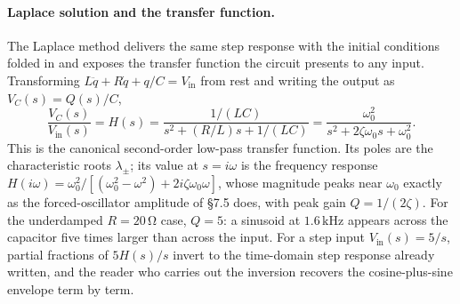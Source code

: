 \paragraph{Laplace solution and the transfer function.} The Laplace
method delivers the same step response with the initial conditions
folded in and exposes the transfer function the circuit presents to
any input. Transforming $L\ddot{q} + R\dot{q} + q/C = V_{\text{in}}$
from rest and writing the output as $V_{C}(s) = Q(s)/C$,
\[
\frac{V_{C}(s)}{V_{\text{in}}(s)} = H(s) = \frac{1/(LC)}{s^{2} +
(R/L)s + 1/(LC)} = \frac{\omega_{0}^{2}}{s^{2} + 2\zeta\omega_{0} s
+ \omega_{0}^{2}}.
\]
This is the canonical second-order low-pass transfer function. Its
poles are the characteristic roots $\lambda_{\pm}$; its value at
$s = i\omega$ is the frequency response $H(i\omega) =
\omega_{0}^{2}/[(\omega_{0}^{2} - \omega^{2}) + 2i\zeta\omega_{0}
\omega]$, whose magnitude peaks near $\omega_{0}$ exactly as the
forced-oscillator amplitude of \S7.5 does, with peak gain $Q =
1/(2\zeta)$. For the underdamped $R = 20\,\si{\ohm}$ case, $Q = 5$:
a sinusoid at $1.6\,\si{\kilo\hertz}$ appears across the capacitor
five times larger than across the input. For a step input
$V_{\text{in}}(s) = 5/s$, partial fractions of $5H(s)/s$ invert to
the time-domain step response already written, and the reader who
carries out the inversion recovers the cosine-plus-sine envelope
term by term.


